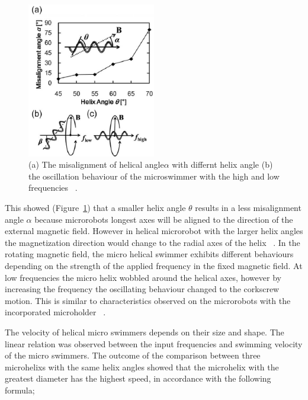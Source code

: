 \documentclass[a4paper,11pt]{article}
\begin{document}
\begin{sloppypar}
\begin{figure}
  \begin{center}
    \includegraphics[width=0.5\textwidth]{7}
  \caption{(a) The misalignment of helical angle$\alpha$ with differnt helix angle (b) the oscillation behaviour
of the microswimmer with the high and low frequencies ~\citep{tottori2012magnetic}.}
  \label{ref7}
\end{center}
\end{figure}

This showed (Figure~\ref{ref7}) that a smaller helix angle $\theta$ results in a less misalignment 
angle $\alpha$ because microrobots longest axes will be aligned to the direction of the external magnetic field. 
However in helical microrobot with the larger helix angles the magnetization direction would change to 
the radial axes of the helix  ~\citep{tottori2012magnetic}.
In the rotating magnetic field, the micro helical swimmer exhibits different behaviours depending on 
the strength of the applied frequency in the fixed magnetic field. At low frequencies the micro helix wobbled 
around the helical axes, however by increasing the frequency the oscillating behaviour changed to the 
corkscrew motion. This is similar to characteristics observed on the microrobots with the incorporated
 microholder  ~\citep{tottori2012magnetic}. 

The velocity of helical micro swimmers depends on their size and shape. The linear relation was 
observed between the input frequencies and swimming velocity of the micro swimmers. The outcome of 
the comparison between three microhelixs with the same helix angles showed that the microhelix with the
 greatest diameter has the highest speed, in accordance with the following formula;


\end{sloppypar}
\end{document}
